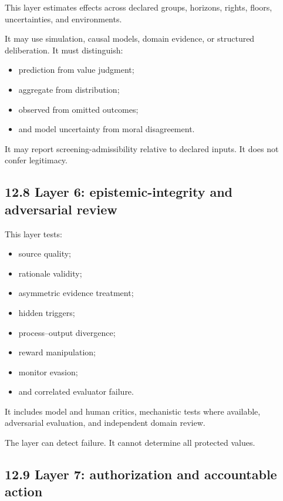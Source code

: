 \documentclass[
  11pt,
]{article}
\providecommand{\tightlist}{%
  \setlength{\itemsep}{0pt}\setlength{\parskip}{0pt}}
\begin{document}
This layer estimates effects across declared groups, horizons, rights,
floors, uncertainties, and environments.

It may use simulation, causal models, domain evidence, or structured
deliberation. It must distinguish:

\begin{itemize}
\tightlist
\item
  prediction from value judgment;
\item
  aggregate from distribution;
\item
  observed from omitted outcomes;
\item
  and model uncertainty from moral disagreement.
\end{itemize}

It may report screening-admissibility relative to declared inputs. It
does not confer legitimacy.

\subsection{12.8 Layer 6: epistemic-integrity and adversarial
review}\label{layer-6-epistemic-integrity-and-adversarial-review}

This layer tests:

\begin{itemize}
\tightlist
\item
  source quality;
\item
  rationale validity;
\item
  asymmetric evidence treatment;
\item
  hidden triggers;
\item
  process--output divergence;
\item
  reward manipulation;
\item
  monitor evasion;
\item
  and correlated evaluator failure.
\end{itemize}

It includes model and human critics, mechanistic tests where available,
adversarial evaluation, and independent domain review.

The layer can detect failure. It cannot determine all protected values.

\subsection{12.9 Layer 7: authorization and accountable
action}\label{layer-7-authorization-and-accountable-action}
\end{document}
